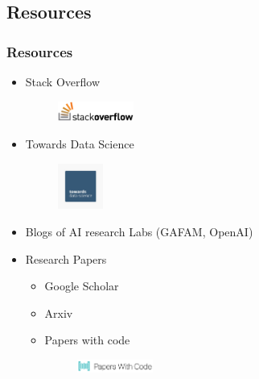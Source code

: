 \subsection{Resources}
\begin{frame}\frametitle{Resources}
   \begin{itemize}
      \item Stack Overflow \hspace{3px}
      \begin{minipage}{0.4\linewidth}
         \begin{figure}[H]
            \includegraphics[width=2.5cm]{../images/illustrations/stackoverflow.png}
         \end{figure}
      \end{minipage}
   
      \item Towards Data Science
      \begin{minipage}{0.3\linewidth}
         \begin{figure}[H]
            \includegraphics[width=1.5cm]{../images/illustrations/tds.png}
         \end{figure}
      \end{minipage}
      \item Blogs of AI research Labs (GAFAM, OpenAI)
      \item Research Papers
      \begin{itemize}
         \item Google Scholar
         \item Arxiv
         \item Papers with code
         \begin{minipage}{0.3\linewidth}
            \begin{figure}[H]
               \includegraphics[width=2.5cm]{../images/illustrations/papers_with_code.png}
            \end{figure}
         \end{minipage}

      \end{itemize}
   \end{itemize}
\end{frame}



